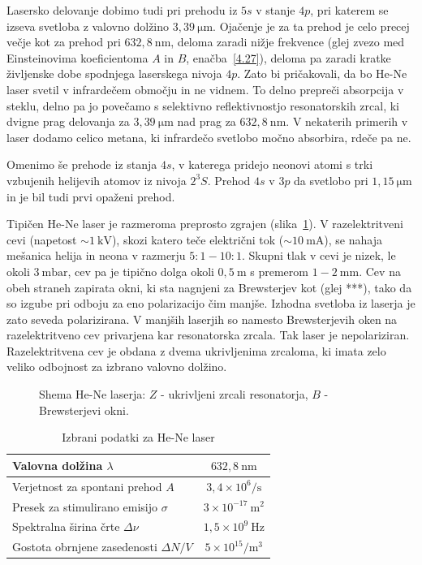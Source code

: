Lasersko delovanje dobimo tudi pri prehodu iz $5s$ v stanje $4p$, pri katerem 
se izseva svetloba z valovno dolžino $3,39~\si{\micro\metre}$. 
Ojačenje je za ta prehod je celo precej večje kot za
prehod pri $632,8~\si{\nano\metre}$, deloma zaradi nižje frekvence 
(glej zvezo med Einsteinovima koeficientoma $A$ in $B$, enačba~\ref{4.27}), 
deloma pa zaradi kratke življenske dobe spodnjega laserskega nivoja $4p$. 
Zato bi pričakovali, da bo He-Ne laser svetil v infrardečem območju in ne vidnem. 
To delno prepreči absorpcija v steklu, delno pa jo povečamo s selektivno reflektivnostjo
resonatorskih zrcal, ki dvigne prag delovanja za $3,39~\si{\micro\metre}$ 
nad prag za $632,8~\si{\nano\metre}$. V nekaterih primerih v laser dodamo
celico metana, ki infrardečo svetlobo močno absorbira, rdeče pa ne.

Omenimo še prehode iz stanja $4s$, v katerega pridejo neonovi atomi s trki
vzbujenih helijevih atomov iz nivoja $2^3S$. Prehod $4s$ v $3p$ da svetlobo
pri $1,15~\si{\micro\metre}$ in je bil tudi prvi opaženi prehod. 

Tipičen He-Ne laser je razmeroma preprosto zgrajen (slika~\ref{fig:HeNeShema}). 
V razelektritveni cevi (napetost  $\sim 1~\si{\kilo\volt}$), skozi
katero teče električni tok ($\sim 10~\si{\milli\ampere}$), 
se nahaja mešanica helija in neona v razmerju 
$5:1 - 10:1$. Skupni tlak v cevi je nizek, le okoli $3~\si{\milli\bar}$, 
cev pa je tipično dolga okoli $0,5~\si{\metre}$ s premerom $1-2~\si{\milli\metre}$.  
Cev na obeh straneh zapirata okni, ki sta nagnjeni za Brewsterjev kot (glej
***), tako da so izgube pri odboju za eno polarizacijo čim manjše.
Izhodna svetloba iz laserja je zato seveda polarizirana. V manjših laserjih
so namesto Brewsterjevih oken na razelektritveno cev privarjena kar
resonatorska zrcala. Tak laser je nepolariziran. 
Razelektritvena cev je obdana z dvema ukrivljenima zrcaloma, 
ki imata zelo veliko odbojnost za izbrano valovno dolžino.
\begin{figure}[h]
\centering
\def\svgwidth{90truemm} 

\caption{Shema He-Ne laserja: $Z$ - ukrivljeni zrcali resonatorja, $B$ - Brewsterjevi
okni.}
\label{fig:HeNeShema}
\end{figure}

\begin{table}
\begin{center}
\begin{tabular}{|l|c|}\hline
Valovna dolžina $\lambda$ & $632,8~\si{\nano\metre}$ \\ \hline
Verjetnost za spontani prehod $A$ & $3,4 \times 10^6/\si{\second}$  \\ \hline
Presek za stimulirano emisijo $\sigma$ & $3 \times 10^{-17}~\si{\metre}^2$  \\ \hline
Spektralna širina črte $\Delta \nu$ & $1,5 \times 10^{9}~\si{\hertz}$  \\ \hline
Gostota obrnjene zasedenosti $\Delta N/V$ & $5 \times 10^{15}/\si{\metre}^3$ \\ \hline
\end{tabular}
\caption{Izbrani podatki za He-Ne laser}
\label{tab:HeNe}
\end{center}
\end{table}

